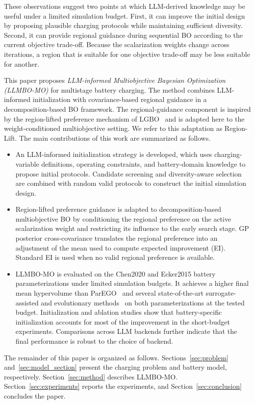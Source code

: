 These observations suggest two points at which LLM-derived knowledge may be
useful under a limited simulation budget. First, it can improve the initial
design by proposing plausible charging protocols while maintaining sufficient
diversity. Second, it can provide regional guidance during sequential BO
according to the current objective trade-off. Because the scalarization weights
change across iterations, a region that is suitable for one objective trade-off
may be less suitable for another.

This paper proposes \emph{LLM-informed Multiobjective Bayesian Optimization
(LLMBO-MO)} for multistage battery charging. The method combines LLM-informed
initialization with covariance-based regional guidance in a decomposition-based
BO framework. The regional-guidance component is inspired by the region-lifted
preference mechanism of LGBO~\cite{ref5} and is adapted here to the
weight-conditioned multiobjective setting. We refer to this adaptation as
Region-Lift. The main contributions of this work are summarized as follows.

\begin{itemize}

    \item An LLM-informed initialization strategy is developed, which uses
    charging-variable definitions, operating constraints, and battery-domain
    knowledge to propose initial protocols. Candidate screening and
    diversity-aware selection are combined with random valid protocols to
    construct the initial simulation design.

    \item Region-lifted preference guidance is adapted to decomposition-based
    multiobjective BO by conditioning the regional preference on the active
    scalarization weight and restricting its influence to the early search
    stage. GP posterior cross-covariance translates the regional preference
    into an adjustment of the mean used to compute expected improvement (EI).
    Standard EI is used when no valid regional preference is available.

    \item LLMBO-MO is evaluated on the Chen2020 and Ecker2015 battery
    parameterizations under limited simulation budgets. It achieves a higher
    final mean hypervolume than ParEGO~\cite{ref4} and several
    state-of-the-art surrogate-assisted and evolutionary
    methods~\cite{refDISK,refPIMD,refNSGAII} on both parameterizations at the
    tested budget. Initialization and ablation studies show that
    battery-specific initialization accounts for most of the improvement in
    the short-budget experiments. Comparisons across LLM backends further
    indicate that the final performance is robust to the choice of backend.

\end{itemize}

The remainder of this paper is organized as follows.
Sections~\ref{sec:problem} and~\ref{sec:model_section} present the charging
problem and battery model, respectively. Section~\ref{sec:method} describes
LLMBO-MO. Section~\ref{sec:experiments} reports the experiments, and
Section~\ref{sec:conclusion} concludes the paper.
